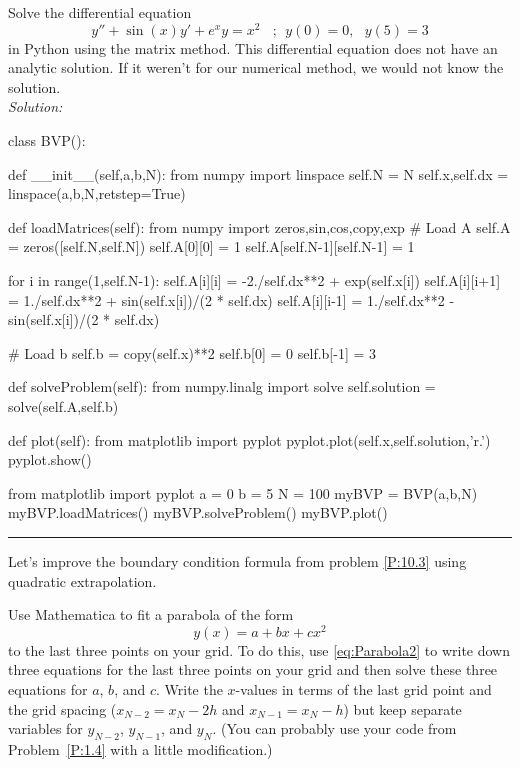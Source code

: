 \begin{enumerate}
\prob \label{P:2.2b} Solve the differential
    equation
    \begin{equation}
        y'' + \sin{(x)} y' +e^{x} y = x^2~~~~;~~y(0)=0,~~~y(5)=3
    \end{equation}
    in Python using the matrix method. This differential equation does
    not have an analytic solution.  If it weren't for our numerical
    method, we would not know the solution.\\
\ifsolutions
\textit{Solution:}\\
\begin{codeexample}
\begin{VerbatimOut}{\listingFile}
class BVP():

    def __init__(self,a,b,N):
        from numpy import linspace
        self.N = N
        self.x,self.dx = linspace(a,b,N,retstep=True)


    def loadMatrices(self):
        from numpy import zeros,sin,cos,copy,exp
        # Load A
        self.A = zeros([self.N,self.N])
        self.A[0][0] = 1
        self.A[self.N-1][self.N-1] = 1

        for i in range(1,self.N-1):
            self.A[i][i] = -2./self.dx**2 + exp(self.x[i])
            self.A[i][i+1] = 1./self.dx**2 + sin(self.x[i])/(2 * self.dx)
            self.A[i][i-1] = 1./self.dx**2 - sin(self.x[i])/(2 * self.dx)

        # Load b
        self.b = copy(self.x)**2
        self.b[0] = 0
        self.b[-1] = 3

    def solveProblem(self):
        from numpy.linalg import solve
        self.solution = solve(self.A,self.b)

    def plot(self):
        from matplotlib import pyplot
        pyplot.plot(self.x,self.solution,'r.')
        pyplot.show()

from matplotlib import pyplot
a = 0
b = 5
N = 100
myBVP = BVP(a,b,N)
myBVP.loadMatrices()
myBVP.solveProblem()
myBVP.plot()
\end{VerbatimOut}
\end{codeexample}
\else
\noindent\rule{5 in}{0.01 in}
\fi
\prob \label{P:10.6}  Let's improve the boundary condition
    formula from problem \ref{P:10.3} using quadratic extrapolation.
\begin{enumerate}
  \subprob Use Mathematica to fit a parabola of the form
    \begin{equation}\label{eq:Parabola2}
    y(x) = a + b x + c x^2
    \end{equation}
    to the last three points on your grid. To do this, use
    \eqref{eq:Parabola2} to write down three equations for the last
    three points on your grid and then solve these three equations for
    $a$, $b$, and $c$. Write the $x$-values in terms of the last grid
    point and the grid spacing ($x_{N-2}=x_N-2h$ and $x_{N-1}=x_N-h$)
    but keep separate variables for $y_{N-2}$, $y_{N-1}$, and $y_N$.
    (You can probably use your code from Problem~\ref{P:1.4} with a
    little modification.)


\end{enumerate}
\end{enumerate}
